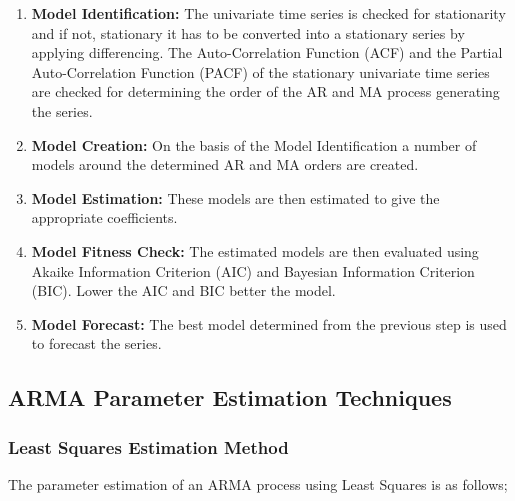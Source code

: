 \documentclass[journal]{IEEEtran}
\begin{document}
\begin{enumerate}

  \item \textbf{Model Identification:} The univariate time series is checked for stationarity and if not, stationary it has to be converted into a stationary series by applying differencing. The Auto-Correlation Function (ACF) and the Partial Auto-Correlation Function (PACF) of the stationary univariate time series are checked for determining the order of the AR and MA process generating the series.
  \item \textbf{Model Creation:} On the basis of the Model Identification a number of models around the determined AR and MA orders are created.
  \item \textbf{Model Estimation:} These models are then estimated to give the appropriate coefficients.
  \item \textbf{Model Fitness Check:} The estimated models are then evaluated using Akaike Information Criterion (AIC) and Bayesian Information Criterion (BIC). Lower the AIC and BIC better the model.
  \item \textbf{Model Forecast:} The best model determined from the previous step is used to forecast the series.


\end{enumerate}



\subsection{ARMA Parameter Estimation Techniques}



\subsubsection{Least Squares Estimation Method}

The parameter estimation of an ARMA process using Least Squares is as follows;
\end{document}

